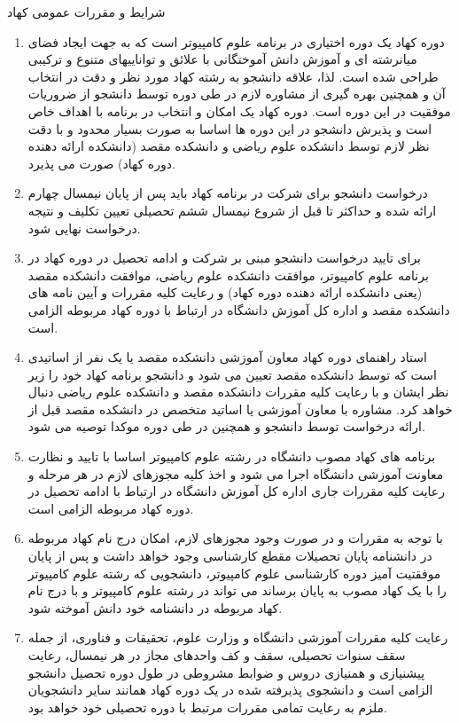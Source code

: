 \documentclass{article}
\begin{document}
شرایط و مقررات عمومی کهاد
\begin{enumerate}
    \item
     دوره کهاد یک دوره اختیاری در برنامه علوم کامپیوتر است که به جهت ایجاد فضای میانرشته ای و آموزش دانش آموختگانی با علائق و تواناییهای متنوع و ترکیبی طراحی شده است. لذا، علاقه دانشجو به رشته کهاد مورد نظر و دقت در انتخاب آن و همچنین بهره گیری از مشاوره لازم در طی دوره توسط دانشجو از ضروریات موفقیت در این دوره است. دوره کهاد یک امکان و انتخاب در برنامه با اهداف خاص است و پذیرش دانشجو در این دوره ها اساسا به صورت بسیار محدود و با دقت نظر لازم توسط دانشکده علوم ریاضی و دانشکده مقصد (دانشکده ارائه دهنده دوره کهاد) صورت می پذیرد.
	\item
	 درخواست دانشجو برای شرکت در برنامه کهاد باید پس از پایان نیمسال چهارم ارائه شده و حداکثر تا قبل از شروع نیمسال ششم تحصیلی تعیین تکلیف و نتیجه درخواست نهایی شود.
	\item
	 برای تایید درخواست دانشجو مبنی بر شرکت و ادامه تحصیل در دوره کهاد در برنامه علوم کامپیوتر، موافقت دانشکده علوم ریاضی، موافقت دانشکده مقصد (یعنی دانشکده ارائه دهنده دوره کهاد) و رعایت کلیه مقررات و آیین نامه های دانشکده مقصد و اداره کل آموزش دانشگاه در ارتباط با دوره کهاد مربوطه الزامی است.
	\item
	 استاد راهنمای دوره کهاد معاون آموزشی دانشکده مقصد یا یک نفر از اساتیدی است که توسط دانشکده مقصد تعیین می شود و دانشجو برنامه کهاد خود را زیر نظر ایشان و با رعایت کلیه مقررات دانشکده مقصد و دانشکده علوم ریاضی دنبال خواهد کرد. مشاوره با معاون آموزشی یا اساتید متخصص در دانشکده مقصد قبل از ارائه درخواست توسط دانشجو و همچنین در طی دوره موکدا توصیه می شود.
	\item
	 برنامه های کهاد مصوب دانشگاه در رشته علوم کامپیوتر اساسا با تایید و نظارت معاونت آموزشی دانشگاه اجرا می شود و اخذ کلیه مجوزهای لازم در هر مرحله و رعایت کلیه مقررات جاری اداره کل آموزش دانشگاه در ارتباط با ادامه تحصیل در دوره کهاد مربوطه الزامی است.
	\item
	 با توجه به مقررات و در صورت وجود مجوزهای لازم، امکان درج نام کهاد مربوطه در دانشنامه پایان تحصیلات مقطع کارشناسی وجود خواهد داشت و پس از پایان موفقتیت آمیز دوره کارشناسی علوم کامپیوتر، دانشجویی که رشته علوم کامپیوتر را با یک کهاد مصوب به پایان برساند می تواند در رشته علوم کامپیوتر و با درج نام کهاد مربوطه در دانشنامه خود دانش آموخته شود.
	\item
	 رعایت کلیه مقررات آموزشی دانشگاه و وزارت علوم، تحقیقات و فناوری، از جمله سقف سنوات تحصیلی، سقف و کف واحدهای مجاز در هر نیمسال، رعایت پیشنیازی و همنیازی دروس و ضوابط مشروطی در طول دوره تحصیل دانشجو الزامی است و دانشجوی پذیرفته شده در یک دوره کهاد همانند سایر دانشجویان ملزم به رعایت تمامی مقررات مرتبط با دوره تحصیلی خود خواهد بود.
\end{enumerate}
\end{document}
